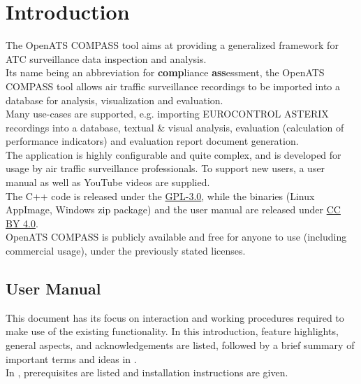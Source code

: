\chapter{Introduction}

The OpenATS COMPASS tool aims at providing a generalized framework for ATC surveillance data inspection and analysis. \\

Its name being an abbreviation for \textbf{comp}liance \textbf{ass}essment, the OpenATS COMPASS tool allows air traffic surveillance recordings to be imported into a database for analysis, visualization and evaluation. \\

Many use-cases are supported, e.g. importing EUROCONTROL ASTERIX recordings into a database, textual \& visual analysis, evaluation (calculation of performance indicators) and evaluation report document generation. \\

The application is highly configurable and quite complex, and is developed for usage by air traffic surveillance professionals. To support new users, a user manual as well as YouTube videos are supplied. \\

The C++ code is released under the \href{https://www.gnu.org/licenses/gpl-3.0.en.html}{GPL-3.0}, while the binaries (Linux AppImage, Windows zip package) and the user manual are released under \href{https://creativecommons.org/licenses/by/4.0/}{CC BY 4.0}. \\

OpenATS COMPASS is publicly available and free for anyone to use (including commercial usage), under the previously stated licenses.

\section{User Manual}

This document has its focus on interaction and working procedures required to make use of the existing functionality. In this introduction, feature highlights, general aspects, and acknowledgements are listed, followed by a brief summary of important terms and ideas in . \\

In , prerequisites are listed and installation instructions are given. \\

